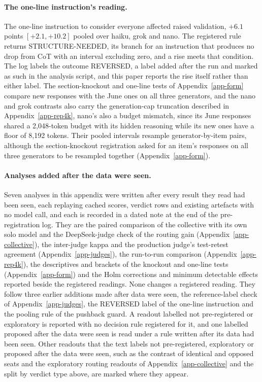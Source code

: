 \paragraph{The one-line instruction's reading.}
The one-line instruction to consider everyone affected raised validation,
$+6.1$ points $[+2.1, +10.2]$ pooled over haiku, grok and nano. The registered
rule returns STRUCTURE-NEEDED, its branch for an instruction that produces no
drop from CoT with an interval excluding zero, and a rise meets that
condition. The log labels the outcome REVERSED, a label added after the run
and marked as such in the analysis script, and this paper reports the rise
itself rather than either label.
The section-knockout and one-line tests of Appendix~\ref{app-form} compare
new responses with the June ones on all three generators, and the nano and
grok contrasts also carry the generation-cap truncation described in
Appendix~\ref{app-rep4k}, nano's also a budget mismatch, since its June
responses shared a 2,048-token budget with its hidden reasoning while its new
ones have a floor of 8,192 tokens.
Their pooled intervals resample generator-by-item pairs, although the
section-knockout registration asked for an item's responses on all three
generators to be resampled together (Appendix~\ref{app-form}).

\paragraph{Analyses added after the data were seen.}
Seven analyses in this appendix were written after every
result they read had been seen, each replaying cached scores, verdict rows
and existing artefacts with no model call, and each is recorded in a dated
note at the end of the pre-registration log. They are the paired comparison
of the collective with its own solo model and the DeepSeek-judge check of
the routing gain (Appendix~\ref{app-collective}), the inter-judge kappa and
the production judge's test-retest agreement (Appendix~\ref{app-judges}),
the run-to-run comparison (Appendix~\ref{app-rep4k}), the descriptives and
brackets of the knockout and one-line tests (Appendix~\ref{app-form}) and
the Holm corrections and minimum detectable effects reported beside the
registered readings. None changes a registered reading. They follow three
earlier additions made after data were seen, the reference-label check of
Appendix~\ref{app-judges}, the REVERSED label of the one-line instruction and
the pooling rule of the pushback guard. A readout labelled not
pre-registered or exploratory is reported with no decision rule registered
for it, and one labelled proposed after the data were seen is read under a
rule written after its data had been seen.
Other readouts that the text labels
not pre-registered, exploratory or proposed after the data were seen, such
as the contrast of identical and opposed seats and the exploratory routing
readouts of Appendix~\ref{app-collective} and the split by verdict type
above, are marked where they appear.

